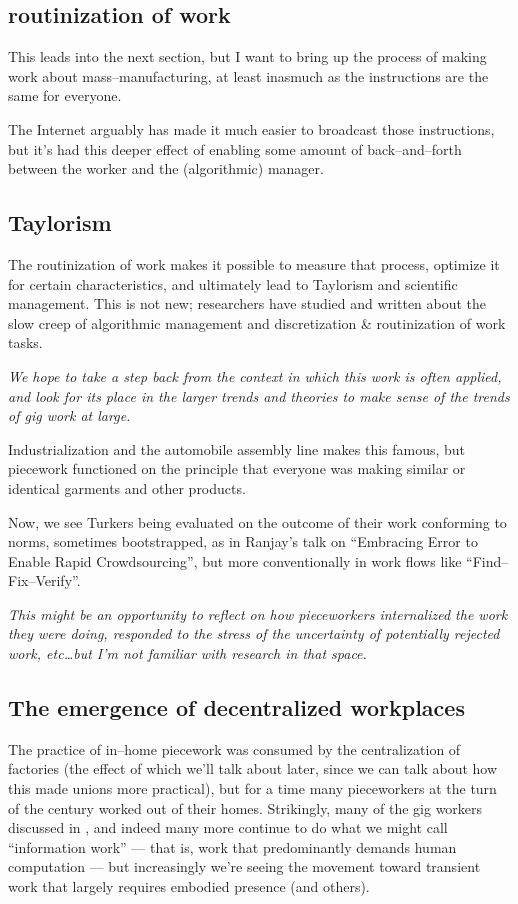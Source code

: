 \documentclass{sigchi}
\begin{document}
\subsection{routinization of work}
This leads into the next section, but I want to bring up the process of
making work about mass--manufacturing, at least inasmuch as
the instructions are the same for everyone.

The Internet arguably has made it much easier to broadcast those instructions,
but it's had this deeper effect of enabling some amount of back--and--forth
between the worker and the (algorithmic) manager.

\subsection{Taylorism}
The routinization of work makes it possible to measure that process,
optimize it for certain characteristics, and ultimately
lead to Taylorism and scientific management.
This is not new;
researchers have studied and written about the slow creep of
algorithmic management and 
discretization \& routinization of work tasks.

\textit{We hope to take a step back from the context in which this work is often applied, and
look for its place in the larger trends and theories
to make sense of the trends of gig work at large.}

Industrialization and the automobile assembly line makes this famous,
but piecework functioned on the principle that everyone was making similar
or identical
garments and other products.

Now, we see Turkers being evaluated on the outcome of their work conforming to norms,
sometimes bootstrapped,
as in Ranjay's talk on 
``Embracing Error to Enable Rapid Crowdsourcing'',
but more conventionally in work flows like ``Find--Fix--Verify''.

\textit{This might be an opportunity to reflect on
how pieceworkers internalized the work they were doing,
responded to the stress of the uncertainty of potentially rejected work,
etc\dots but I'm not familiar with research in that space.}

\subsection{The emergence of decentralized workplaces}
The practice of in--home piecework was consumed by
the centralization of factories
(the effect of which we'll talk about later, since
we can talk about how this made unions more practical),
but for a time many pieceworkers
at the turn of the  century
worked out of their homes.
Strikingly, many of the gig workers
\citeauthor{crowdworkFuture}
discussed in
\citeyear{crowdworkFuture},
and indeed many more continue to do what we might call ``information work''
--- that is, work that predominantly demands human computation ---
but increasingly we're seeing the movement toward transient work that largely requires embodied presence
\cite{uberAlgorithm} (and others).
\end{document}

